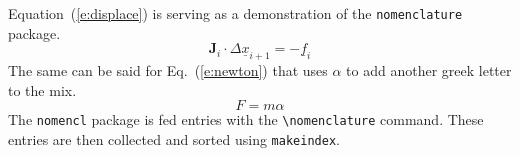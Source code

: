 \documentclass[]{aiaa-tc}%
\newcommand{\eqnref}[1]{(\ref{#1})}
\newcommand{\package}[1]{\texttt{#1}}
\begin{document}
Equation~\eqnref{e:displace} is serving as a demonstration of the
\package{nomenclature} package.
\begin{equation}
  \label{e:displace}
  \mathbf{J}_i\cdot\Delta\underline{x}_{i+1}=-\underline{f}_i
\end{equation}%
%
%
%
%
%
The same can be said for Eq.~\eqnref{e:newton} that uses $\alpha$ to add
another greek letter to the mix.
\begin{equation}
  \label{e:newton}
  F=m\alpha
\end{equation}%
%
%
%
The \package{nomencl} package is fed entries with the
\verb|\nomenclature| command.
These entries are then collected and sorted using \verb|makeindex|.
\end{document}
